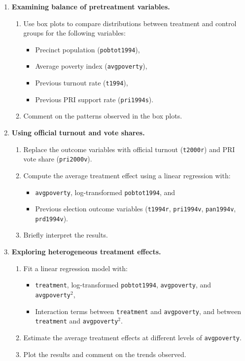 \documentclass[12pt]{article}
\begin{document}
\begin{enumerate}
    \item \textbf{Examining balance of pretreatment variables.}
    \begin{enumerate}[label=(\alph*)]
        \item Use box plots to compare distributions between treatment and control groups for the following variables:
        \begin{itemize}
            \item Precinct population (\texttt{pobtot1994}),
            \item Average poverty index (\texttt{avgpoverty}),
            \item Previous turnout rate (\texttt{t1994}),
            \item Previous PRI support rate (\texttt{pri1994s}).
        \end{itemize}
        \item Comment on the patterns observed in the box plots.
    \end{enumerate}

    \item \textbf{Using official turnout and vote shares.}
    \begin{enumerate}[label=(\alph*)]
        \item Replace the outcome variables with official turnout (\texttt{t2000r}) and PRI vote share (\texttt{pri2000v}).
        \item Compute the average treatment effect using a linear regression with:
        \begin{itemize}
            \item \texttt{avgpoverty}, log-transformed \texttt{pobtot1994}, and
            \item Previous election outcome variables (\texttt{t1994r}, \texttt{pri1994v}, \texttt{pan1994v}, \texttt{prd1994v}).
        \end{itemize}
        \item Briefly interpret the results.
    \end{enumerate}

    \item \textbf{Exploring heterogeneous treatment effects.}
    \begin{enumerate}[label=(\alph*)]
        \item Fit a linear regression model with:
        \begin{itemize}
            \item \texttt{treatment}, log-transformed \texttt{pobtot1994}, \texttt{avgpoverty}, and \texttt{avgpoverty}$^2$,
            \item Interaction terms between \texttt{treatment} and \texttt{avgpoverty}, and between \texttt{treatment} and \texttt{avgpoverty}$^2$.
        \end{itemize}
        \item Estimate the average treatment effects at different levels of \texttt{avgpoverty}.
        \item Plot the results and comment on the trends observed.
    \end{enumerate}
\end{enumerate}
\end{document}
